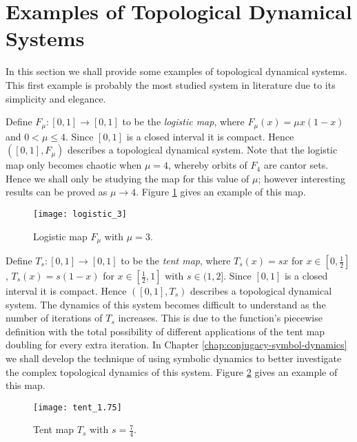 \section{Examples of Topological Dynamical Systems}

In this section we shall provide some examples of topological dynamical systems. This first example is probably the most studied system in literature due to its simplicity and elegance.

\begin{exmp} \label{exmp:logitic-map}
    Define $F_{\mu}: [0, 1] \to [0, 1]$ to be the \emph{logistic map}, where $F_{\mu}(x)=\mu x(1-x)$ and $0 < \mu \leq 4$. Since $[0, 1]$ is a closed interval it is compact. Hence $([0, 1], F_{\mu})$ describes a topological dynamical system. Note that the logistic map only becomes chaotic when $\mu = 4$, whereby orbits of $F_4$ are cantor sets. Hence we shall only be studying the map for this value of $\mu$; however interesting results can be proved as $\mu \to 4$. Figure \ref{fig:logistic_3} gives an example of this map.

    \begin{figure}[h]
        \centering
        \texttt{[image: logistic\_3]}
        \caption{Logistic map $F_\mu$ with $\mu = 3$.}
        \label{fig:logistic_3}
    \end{figure}
\end{exmp}

\begin{exmp} \label{exmp:tent-map}
    Define $T_s: [0, 1] \to [0,1]$ to be the \emph{tent map}, where $T_s(x) = sx$ for $x \in \left[0, \frac{1}{2}\right]$, $T_s(x) = s(1-x)$ for $x \in \left[\frac{1}{2}, 1\right]$ with $s \in (1, 2]$. Since $[0, 1]$ is a closed interval it is compact. Hence $([0, 1], T_s)$ describes a topological dynamical system. The dynamics of this system becomes difficult to understand as the number of iterations of $T_s$ increases. This is due to the function's piecewise definition with the total possibility of different applications of the tent map doubling for every extra iteration. In Chapter \ref{chap:conjugacy-symbol-dynamics} we shall develop the technique of using symbolic dynamics to better investigate the complex topological dynamics of this system. Figure \ref{fig:tent_1.75} gives an example of this map.

    \begin{figure}[H]
        \centering
        \texttt{[image: tent\_1.75]}
        \caption{Tent map $T_s$ with $s = \frac{7}{4}$.}
        \label{fig:tent_1.75}
    \end{figure}
\end{exmp}

